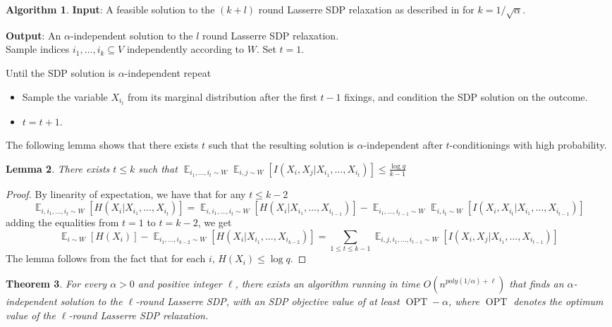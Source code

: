 \documentclass[11pt]{article}
\newtheorem{theorem}{Theorem}[section]
\newtheorem{lemma}[theorem]{Lemma}
\theoremstyle{definition}
\newtheorem{algorithm}[theorem]{Algorithm}
\newenvironment{mybox}
{\center \noindent\begin{boxedminipage}{1.0\linewidth}}
{\end{boxedminipage}
\noindent
}
\newcommand{\Esymb}{\mathbb{E}}
\DeclareMathOperator*{\E}{\Esymb}
\DeclareMathOperator{\OPT}{OPT}
\renewcommand{\leq}{\leqslant}
\numberwithin{equation}{section}
\let\pref=\prettyref
\begin{document}
\begin{mybox}
\begin{algorithm}

{\bf Input}: A feasible solution to the $(k+l)$ round Lasserre SDP
relaxation as described in \pref{sec:prelim} for $k=1/\sqrt{\alpha}$.

{\bf Output}: An $\alpha$-independent solution to the $l$ round Lasserre SDP
relaxation.\\

Sample indices ${i_1},\ldots,{i_{k}} \subseteq V$ independently according to $W$.  Set $t = 1$.

Until the SDP solution is $\alpha$-independent repeat
\begin{itemize}\itemsep=0ex
	\item	Sample the variable $X_{i_t}$ from its marginal distribution after the
	first $t-1$ fixings, and condition the SDP solution on the outcome.
\item $t = t+1$.
\end{itemize}
\end{algorithm}
\end{mybox}


The following lemma shows that there exists $t$ such that the
resulting solution is $\alpha$-independent after $t$-conditionings with high probability.
\begin{lemma} \label{lem:existlowmi}
There exists $t\leq k$ such that $\E_{i_1,\ldots,i_t \sim
W}\E_{i,j\sim W}[I(X_i,X_j|X_{i_1},\ldots,X_{i_{t}})]\leq \frac{\log q}{k-1}$
\end{lemma}

\begin{proof}
By linearity of expectation, we have that for any $t\leq k-2$
$$
\E_{i,i_1,\ldots,i_t \sim W}[H(X_i|X_{i_1},\ldots,X_{i_t})]=
\E_{i,i_1,\ldots,i_t \sim W} [H(X_i|X_{i_1},\ldots,X_{i_{t-1}})]-
\E_{i_1,\ldots,i_{t-1} \sim W}\E_{i,i_t \sim W}[
I(X_i,X_{i_t}|X_{i_1},\ldots,X_{i_{t-1}})]
$$
adding the equalities from $t=1$ to $t=k-2$, we get
$$
\E_{i \sim W}[H(X_i)]-\E_{i_{1},\ldots,i_{k-2}\sim
W}[H(X_i|X_{i_1},\ldots,X_{i_{k-2}})]=\sum_{1\leq t\leq
k-1}\E_{i, j, i_1,\ldots,i_{t-1} \sim
W}[I(X_i,X_j|X_{i_1},\ldots,X_{i_{t-1}})]
$$
The lemma follows from the fact that for each $i$, $H(X_i)\leq \log q$.
\end{proof}


\begin{theorem}  \label{thm:alphaindependentsol}
For every $\alpha>0$ and positive integer $\ell$, there exists an algorithm running in time
$O(n^{poly(1/\alpha)+\ell})$ that finds an
$\alpha$-independent solution to the $\ell$-round Lasserre SDP,
with an SDP objective value of at least $\OPT-\alpha$, where $\OPT$
denotes the optimum value of the $\ell$-round Lasserre SDP relaxation.
\end{theorem}
\end{document}
